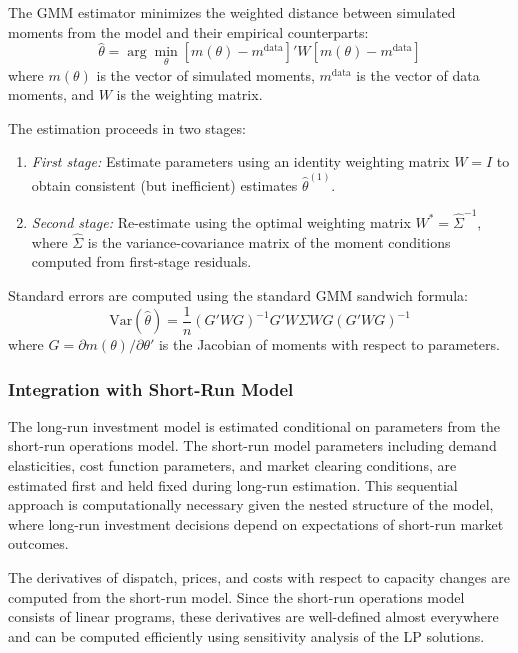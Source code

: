 \documentclass[12pt]{article}
\begin{document}
The GMM estimator minimizes the weighted distance between simulated moments from the model and their empirical counterparts:
\begin{equation}\label{eq:gmm_objective}
    \hat{\theta} = \arg\min_\theta \left[ m(\theta) - m^{\text{data}} \right]' W \left[ m(\theta) - m^{\text{data}} \right]
\end{equation}
where $m(\theta)$ is the vector of simulated moments, $m^{\text{data}}$ is the vector of data moments, and $W$ is the weighting matrix.

The estimation proceeds in two stages:
\begin{enumerate}
    \item \textit{First stage:} Estimate parameters using an identity weighting matrix $W = I$ to obtain consistent (but inefficient) estimates $\hat{\theta}^{(1)}$.
    \item \textit{Second stage:} Re-estimate using the optimal weighting matrix $W^* = \hat{\Sigma}^{-1}$, where $\hat{\Sigma}$ is the variance-covariance matrix of the moment conditions computed from first-stage residuals.
\end{enumerate}

Standard errors are computed using the standard GMM sandwich formula:
\begin{equation}\label{eq:gmm_variance}
    \text{Var}(\hat{\theta}) = \frac{1}{n} \left( G' W G \right)^{-1} G' W \Sigma W G \left( G' W G \right)^{-1}
\end{equation}
where $G = \partial m(\theta) / \partial \theta'$ is the Jacobian of moments with respect to parameters.

\subsubsection{Integration with Short-Run Model}\label{subsec:integration}

The long-run investment model is estimated conditional on parameters from the short-run operations model. The short-run model parameters including demand elasticities, cost function parameters, and market clearing conditions, are estimated first and held fixed during long-run estimation. This sequential approach is computationally necessary given the nested structure of the model, where long-run investment decisions depend on expectations of short-run market outcomes.

The derivatives of dispatch, prices, and costs with respect to capacity changes are computed from the short-run model. Since the short-run operations model consists of linear programs, these derivatives are well-defined almost everywhere and can be computed efficiently using sensitivity analysis of the LP solutions.
\end{document}
